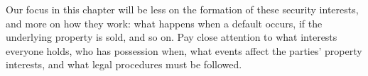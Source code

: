 Our focus in this chapter will be less on the formation of these security
interests, and more on how they work: what happens when a default occurs, if the
underlying property is sold, and so on. Pay close attention to what interests
everyone holds, who has possession when, what events affect the parties'
property interests, and what legal procedures must be followed.


